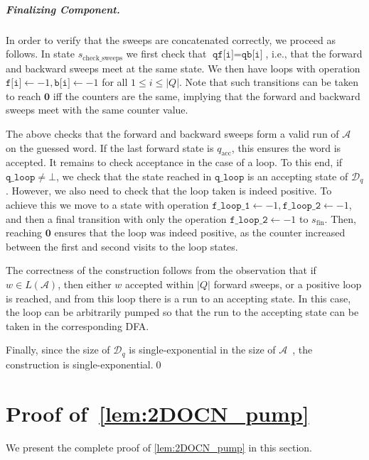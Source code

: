 \documentclass[USenglish]{lipics-v2021}
\newcommand{\accstate}{q_{\mathrm{acc}}}
\renewcommand{\vec}[1]{\boldsymbol{#1}}
\newcommand{\adds}[1]{\leftarrow #1}
\newcommand{\vf}[1]{\texttt{#1}}
\newcommand{\cA}{\mathcal{A}}
\newcommand{\cD}{\mathcal{D}}
\begin{document}
\subparagraph*{Finalizing Component.} In order to verify that the sweeps are
concatenated correctly, we proceed as follows. In state
$s_{\textrm{check\_sweeps}}$ we first check that $\vf{qf[i]}=\vf{qb[i]}$, i.e.,
that the forward and backward sweeps meet at the same state. We then have loops
with operation $\vf{f[i]}\adds{-1},\vf{b[i]}\adds{-1}$ for all $1\le i\le |Q|$. Note
that such transitions can be taken to reach $\vec{0}$ iff the counters are the
same, implying that the forward and backward sweeps meet with the same counter
value.

The above checks that the forward and backward sweeps form a valid run of $\cA$
on the guessed word. If the last forward state is $\accstate$, this ensures the
word is accepted. It remains to check acceptance in the case of a loop.  To this
end, if $\vf{q\_loop}\neq \bot$, we check that the state reached in $\vf{q\_loop}$ is
an accepting state of $\cD_q$. However, we also need to check that the loop
taken is indeed positive. To achieve this we move to a state with operation
$\vf{f\_loop\_1}\adds{-1},\vf{f\_loop\_2}\adds{-1}$, and then a final transition
with only the operation $\vf{f\_loop\_2}\adds{-1}$ to $s_{\textrm{fin}}$. Then,
reaching $\vec{0}$ ensures that the loop was indeed positive, as the counter
increased between the first and second visits to the loop states.

The correctness of the construction follows from the observation that if $w\in
L(\cA)$, then either $w$ accepted within $|Q|$ forward sweeps, or a positive
loop is reached, and from this loop there is a run to an accepting state. In
this case, the loop can be arbitrarily pumped so that the run to the accepting
state can be taken in the corresponding DFA.

Finally, since the size of $\cD_q$ is single-exponential in the size of
$\cA$~\cite{shepherdson1959reduction,rabin1959finite,vardi1989note}, the
construction is single-exponential.\hfill \qed



\section{Proof of~\cref{lem:2DOCN_pump}}
\label{apx:proofs_nondet_vs_det}
We present the complete proof of \cref{lem:2DOCN_pump} in this
section. 
\end{document}
